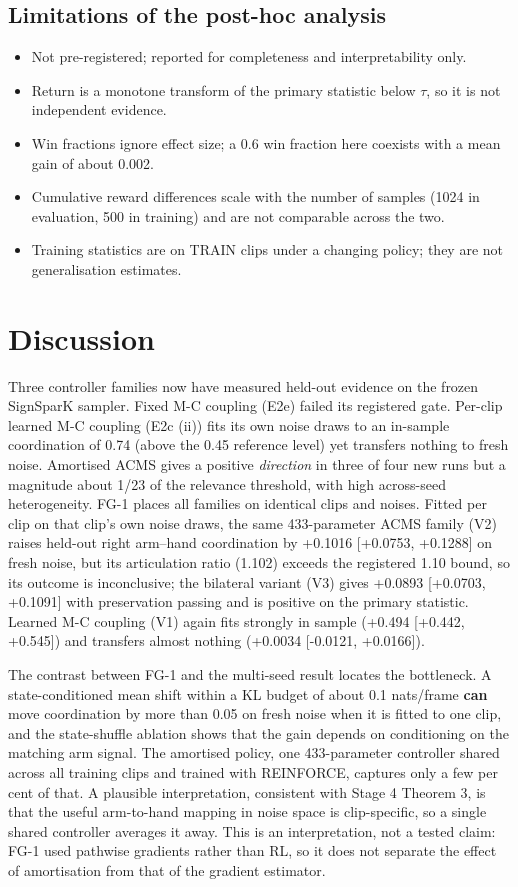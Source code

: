 \documentclass[conference]{IEEEtran}
\begin{document}
\subsection{Limitations of the post-hoc analysis}
\begin{itemize}\item Not pre-registered; reported for completeness and interpretability only.\item Return is a monotone transform of the primary statistic below $\tau$, so it is not independent evidence.\item Win fractions ignore effect size; a 0.6 win fraction here coexists with a mean gain of about 0.002.\item Cumulative reward differences scale with the number of samples (1024 in evaluation, 500 in training) and are not comparable across the two.\item Training statistics are on TRAIN clips under a changing policy; they are not generalisation estimates.\end{itemize}
\section{Discussion}
Three controller families now have measured held-out evidence on the frozen SignSparK sampler. Fixed M-C coupling (E2e) failed its registered gate. Per-clip learned M-C coupling (E2c (ii)) fits its own noise draws to an in-sample coordination of 0.74 (above the 0.45 reference level) yet transfers nothing to fresh noise. Amortised ACMS gives a positive \emph{direction} in three of four new runs but a magnitude about 1/23 of the relevance threshold, with high across-seed heterogeneity. FG-1 places all families on identical clips and noises. Fitted per clip on that clip's own noise draws, the same 433-parameter ACMS family (V2) raises held-out right arm--hand coordination by +0.1016 [+0.0753, +0.1288] on fresh noise, but its articulation ratio (1.102) exceeds the registered 1.10 bound, so its outcome is inconclusive; the bilateral variant (V3) gives +0.0893 [+0.0703, +0.1091] with preservation passing and is positive on the primary statistic. Learned M-C coupling (V1) again fits strongly in sample (+0.494 [+0.442, +0.545]) and transfers almost nothing (+0.0034 [-0.0121, +0.0166]).

The contrast between FG-1 and the multi-seed result locates the bottleneck. A state-conditioned mean shift within a KL budget of about 0.1 nats/frame \textbf{can} move coordination by more than 0.05 on fresh noise when it is fitted to one clip, and the state-shuffle ablation shows that the gain depends on conditioning on the matching arm signal. The amortised policy, one 433-parameter controller shared across all training clips and trained with REINFORCE, captures only a few per cent of that. A plausible interpretation, consistent with Stage 4 Theorem 3, is that the useful arm-to-hand mapping in noise space is clip-specific, so a single shared controller averages it away. This is an interpretation, not a tested claim: FG-1 used pathwise gradients rather than RL, so it does not separate the effect of amortisation from that of the gradient estimator.
\end{document}
